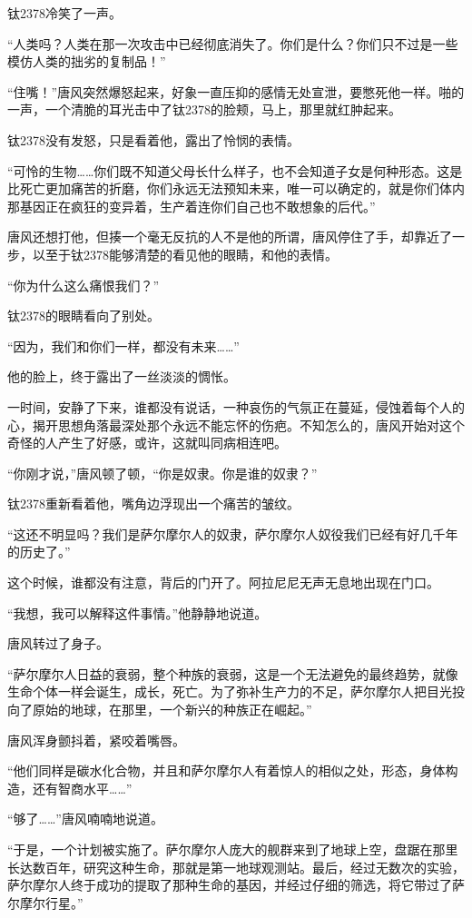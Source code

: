 钛2378冷笑了一声。 

“人类吗？人类在那一次攻击中已经彻底消失了。你们是什么？你们只不过是一些模仿人类的拙劣的复制品！” 

“住嘴！”唐风突然爆怒起来，好象一直压抑的感情无处宣泄，要憋死他一样。啪的一声，一个清脆的耳光击中了钛2378的脸颊，马上，那里就红肿起来。 

钛2378没有发怒，只是看着他，露出了怜悯的表情。 

“可怜的生物……你们既不知道父母长什么样子，也不会知道子女是何种形态。这是比死亡更加痛苦的折磨，你们永远无法预知未来，唯一可以确定的，就是你们体内那基因正在疯狂的变异着，生产着连你们自己也不敢想象的后代。” 

唐风还想打他，但揍一个毫无反抗的人不是他的所谓，唐风停住了手，却靠近了一步，以至于钛2378能够清楚的看见他的眼睛，和他的表情。 

“你为什么这么痛恨我们？” 

钛2378的眼睛看向了别处。 

“因为，我们和你们一样，都没有未来……” 

他的脸上，终于露出了一丝淡淡的惆怅。 

一时间，安静了下来，谁都没有说话，一种哀伤的气氛正在蔓延，侵蚀着每个人的心，揭开思想角落最深处那个永远不能忘怀的伤疤。不知怎么的，唐风开始对这个奇怪的人产生了好感，或许，这就叫同病相连吧。 

“你刚才说，”唐风顿了顿，“你是奴隶。你是谁的奴隶？” 

钛2378重新看着他，嘴角边浮现出一个痛苦的皱纹。 

“这还不明显吗？我们是萨尔摩尔人的奴隶，萨尔摩尔人奴役我们已经有好几千年的历史了。” 

这个时候，谁都没有注意，背后的门开了。阿拉尼尼无声无息地出现在门口。 

“我想，我可以解释这件事情。”他静静地说道。 

唐风转过了身子。 

“萨尔摩尔人日益的衰弱，整个种族的衰弱，这是一个无法避免的最终趋势，就像生命个体一样会诞生，成长，死亡。为了弥补生产力的不足，萨尔摩尔人把目光投向了原始的地球，在那里，一个新兴的种族正在崛起。” 

唐风浑身颤抖着，紧咬着嘴唇。 

“他们同样是碳水化合物，并且和萨尔摩尔人有着惊人的相似之处，形态，身体构造，还有智商水平……” 

“够了……”唐风喃喃地说道。 

“于是，一个计划被实施了。萨尔摩尔人庞大的舰群来到了地球上空，盘踞在那里长达数百年，研究这种生命，那就是第一地球观测站。最后，经过无数次的实验，萨尔摩尔人终于成功的提取了那种生命的基因，并经过仔细的筛选，将它带过了萨尔摩尔行星。” 

